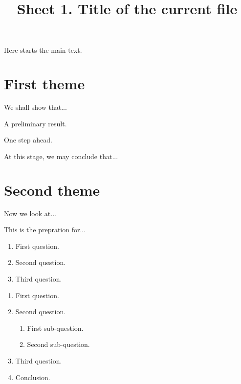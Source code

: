 \documentclass[11pt,
  formal title,
  title in boldface,
]{homework}
\title{%
                    Sheet 1. Title of the current file
}
\author{}
\date{%
}
\begin{document}
Here starts the main text.


\section*{First theme}

We shall show that...

\begin{problem}
    A preliminary result.
\end{problem}

\begin{problem}
    One step ahead.

    \blindtext
\end{problem}

At this stage, we may conclude that...


\section*{Second theme}

Now we look at...

\begin{problem}
    This is the prepration for...
    \begin{enumerate}%
        \item First question.
        \item Second question.
        \item Third question.
    \end{enumerate}
\end{problem}

\begin{problem}
    \leavevmode %
    \begin{enumerate}[itemsep=.5\baselineskip]
        \item First question.
            \\[.5\baselineskip]
            \blindtext
        \item Second question.
        \begin{enumerate}[itemsep=.3\baselineskip]
            \item First sub-question.
                \\[.3\baselineskip]
                \blindtext
            \item Second sub-question.
                \\[.3\baselineskip]
                \blindtext
        \end{enumerate}
        \item Third question.
            \\[.5\baselineskip]
            \blindtext
        \item Conclusion.
    \end{enumerate}
\end{problem}
\end{document}
